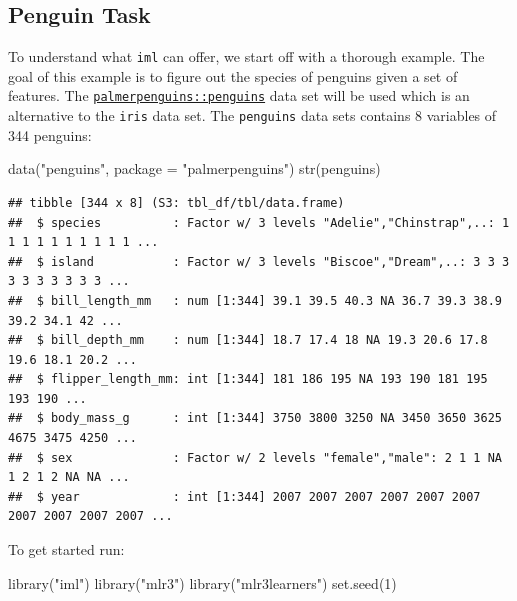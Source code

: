 \documentclass[
]{scrbook}
\newenvironment{Shaded}{\begin{snugshade}}{\end{snugshade}}
\newcommand{\AttributeTok}[1]{\textcolor[rgb]{0.77,0.63,0.00}{#1}}
\newcommand{\DecValTok}[1]{\textcolor[rgb]{0.00,0.00,0.81}{#1}}
\newcommand{\FunctionTok}[1]{\textcolor[rgb]{0.00,0.00,0.00}{#1}}
\newcommand{\NormalTok}[1]{#1}
\newcommand{\StringTok}[1]{\textcolor[rgb]{0.31,0.60,0.02}{#1}}
\renewenvironment{Shaded} {\begin{snugshade}\small} {\end{snugshade}}
\begin{document}
\hypertarget{penguin-task}{%
\subsection{Penguin Task}\label{penguin-task}}

To understand what \texttt{iml} can offer, we start off with a thorough example. The goal of this example is to figure out the species of penguins given a set of features. The \href{https://www.rdocumentation.org/packages/palmerpenguins/topics/penguins}{\texttt{palmerpenguins::penguins}} data set will be used which is an alternative to the \texttt{iris} data set.
The \texttt{penguins} data sets contains 8 variables of 344 penguins:

\begin{Shaded}
\begin{Highlighting}[]
\FunctionTok{data}\NormalTok{(}\StringTok{"penguins"}\NormalTok{, }\AttributeTok{package =} \StringTok{"palmerpenguins"}\NormalTok{)}
\FunctionTok{str}\NormalTok{(penguins)}
\end{Highlighting}
\end{Shaded}

\begin{verbatim}
## tibble [344 x 8] (S3: tbl_df/tbl/data.frame)
##  $ species          : Factor w/ 3 levels "Adelie","Chinstrap",..: 1 1 1 1 1 1 1 1 1 1 ...
##  $ island           : Factor w/ 3 levels "Biscoe","Dream",..: 3 3 3 3 3 3 3 3 3 3 ...
##  $ bill_length_mm   : num [1:344] 39.1 39.5 40.3 NA 36.7 39.3 38.9 39.2 34.1 42 ...
##  $ bill_depth_mm    : num [1:344] 18.7 17.4 18 NA 19.3 20.6 17.8 19.6 18.1 20.2 ...
##  $ flipper_length_mm: int [1:344] 181 186 195 NA 193 190 181 195 193 190 ...
##  $ body_mass_g      : int [1:344] 3750 3800 3250 NA 3450 3650 3625 4675 3475 4250 ...
##  $ sex              : Factor w/ 2 levels "female","male": 2 1 1 NA 1 2 1 2 NA NA ...
##  $ year             : int [1:344] 2007 2007 2007 2007 2007 2007 2007 2007 2007 2007 ...
\end{verbatim}

To get started run:

\begin{Shaded}
\begin{Highlighting}[]
\FunctionTok{library}\NormalTok{(}\StringTok{"iml"}\NormalTok{)}
\FunctionTok{library}\NormalTok{(}\StringTok{"mlr3"}\NormalTok{)}
\FunctionTok{library}\NormalTok{(}\StringTok{"mlr3learners"}\NormalTok{)}
\FunctionTok{set.seed}\NormalTok{(}\DecValTok{1}\NormalTok{)}
\end{Highlighting}
\end{Shaded}
\end{document}

